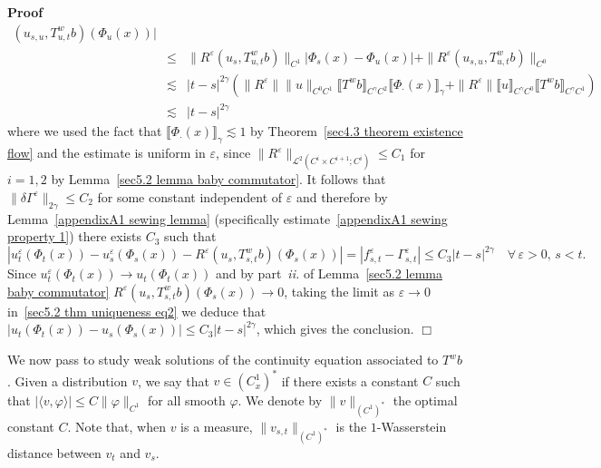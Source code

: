\documentclass[10pt]{article}
\newcommand{\tmtextit}[1]{{\itshape{#1}}}
\newenvironment{proof}{\noindent\textbf{Proof\ }}{\hspace*{\fill}$\Box$\medskip}
\begin{document}
\begin{proof}
\begin{eqnarray*}
    (u_{s, u}, T^w_{u, t} b) (\Phi_u (x)) |\\
    & \leqslant & \| R^{\varepsilon} (u_s, T^w_{u, t} b) \|_{C^1} | \Phi_s
    (x) - \Phi_u (x) | + \| R^{\varepsilon} (u_{s, u}, T^w_{u, t} b)
    \|_{C^0}\\
    & \lesssim & | t - s |^{2 \gamma} (\| R^{\varepsilon} \| \| u \|_{C^0
    C^1}  \llbracket T^w b \rrbracket_{C^{\gamma} C^2} \llbracket \Phi_{\cdot}
    (x) \rrbracket_{\gamma} + \| R^{\varepsilon} \| \llbracket u
    \rrbracket_{C^{\gamma} C^0} \llbracket T^w b \rrbracket_{C^{\gamma}
    C^1})\\
    & \lesssim & | t - s |^{2 \gamma}
  \end{eqnarray*}
  where we used the fact that $\llbracket \Phi_{\cdot} (x) \rrbracket_{\gamma}
  \lesssim 1$ by Theorem~\ref{sec4.3 theorem existence flow} and the estimate
  is uniform in $\varepsilon$, since $\| R^{\varepsilon} \|_{\mathcal{L}^2
  (C^i \times C^{i + 1} ; C^i)} \leqslant C_1$ for $i = 1, 2$ by
  Lemma~\ref{sec5.2 lemma baby commutator}. It follows that $\| \delta
  \Gamma^{\varepsilon} \|_{2 \gamma} \leqslant C_2$ for some constant
  independent of $\varepsilon$ and therefore by Lemma~\ref{appendixA1 sewing
  lemma} (specifically estimate~{\eqref{appendixA1 sewing property 1}}) there
  exists $C_3$ such that
  \begin{equation}
    | u^{\varepsilon}_t (\Phi_t (x)) - u^{\varepsilon}_s (\Phi_s (x)) -
    R^{\varepsilon} (u_s, T^w_{s, t} b) (\Phi_s (x)) | = | f^{\varepsilon}_{s,
    t} - \Gamma^{\varepsilon}_{s, t} | \leqslant C_3 | t - s |^{2 \gamma}
    \quad \forall \, \varepsilon > 0, \, s < t. \label{sec5.2 thm uniqueness
    eq2}
  \end{equation}
  Since $u^{\varepsilon}_t (\Phi_t (x)) \rightarrow u_t (\Phi_t (x))$ and by
  part~\tmtextit{ii.} of Lemma~\ref{sec5.2 lemma baby commutator}
  $R^{\varepsilon} (u_s, T^w_{s, t} b) (\Phi_s (x)) \rightarrow 0$, taking the
  limit as $\varepsilon \rightarrow 0$ in~{\eqref{sec5.2 thm uniqueness eq2}}
  we deduce that $| u_t (\Phi_t (x)) - u_s (\Phi_s (x)) | \leqslant C_3 | t -
  s |^{2 \gamma}$, which gives the conclusion.
\end{proof}

We now pass to study weak solutions of the continuity equation associated to
$T^w b$. Given a distribution $v$, we say that $v \in (C^1_x)^{\ast}$ if there
exists a constant $C$ such that $| \langle v, \varphi \rangle | \leqslant C \|
\varphi \|_{C^1}$ for all smooth $\varphi$. We denote by $\| v
\|_{(C^1)^{\ast}}$ the optimal constant $C$. Note that, when $v$ is a measure,
$\| v_{s, t} \|_{(C^1)^{\ast}}$ is the $1$-Wasserstein distance between $v_t$
and $v_s$.
\end{document}
